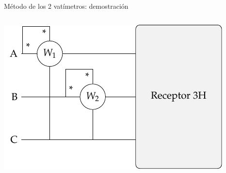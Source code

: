 \documentclass[aspectratio=169, usenames,svgnames,dvipsnames]{beamer}
\begin{document}
\begin{frame}{Método de los 2 vatímetros: \hspace{3mm}demostración}
\begin{columns}
\begin{column}{0.4\linewidth}
        \vspace*{8mm}
        
        \hspace*{-8mm}
        \includegraphics[width=1.1\linewidth]{../figs/Potencia3H.pdf}
	\end{column}
	\end{columns}
\end{frame}

\end{document}
